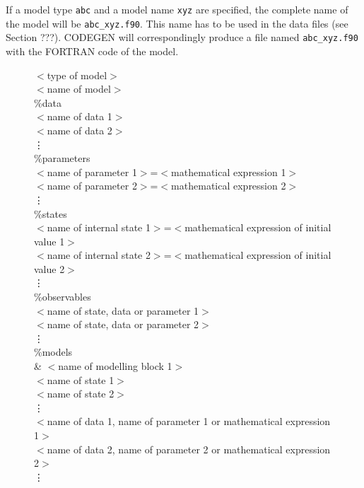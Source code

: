 If a model type {\tt abc} and a model name {\tt xyz} are specified, the complete name of the model will be 
{\tt abc\_xyz.f90}. This name has to be used in the data files (see Section ???). CODEGEN will correspondingly produce a file named {\tt abc\_xyz.f90} with the FORTRAN code of the model.

\begin{figure}[h!]
\large
\begin{mdframed}
$<$type of model$>$\\
$<$name of model$>$\\
\%data\\
$<$name of data 1$>$\\
$<$name of data 2$>$\\
\hspace*{5ex}\vdots \\
\%parameters\\
$<$name of parameter 1$>$=$<$mathematical expression 1$>$ \\
$<$name of parameter 2$>$=$<$mathematical expression 2$>$ \\
\hspace*{5ex}\vdots \\
\%states\\
$<$name of internal state 1$>$=$<$mathematical expression of initial value 1$>$ \\
$<$name of internal state 2$>$=$<$mathematical expression of initial value 2$>$ \\
\hspace*{5ex}\vdots \\
\%observables\\
$<$name of state, data or parameter 1$>$ \\
$<$name of state, data or parameter 2$>$ \\
\hspace*{5ex}\vdots \\
\%models\\
\& $<$name of modelling block 1$>$ \\
$<$name of state 1$>$\\
$<$name of state 2$>$\\
\hspace*{5ex}\vdots \\
$<$name of data 1, name of parameter 1 or mathematical expression 1$>$ \\
$<$name of data 2, name of parameter 2 or mathematical expression 2$>$ \\
\hspace*{5ex}\vdots \\

\end{mdframed}
\end{figure}
